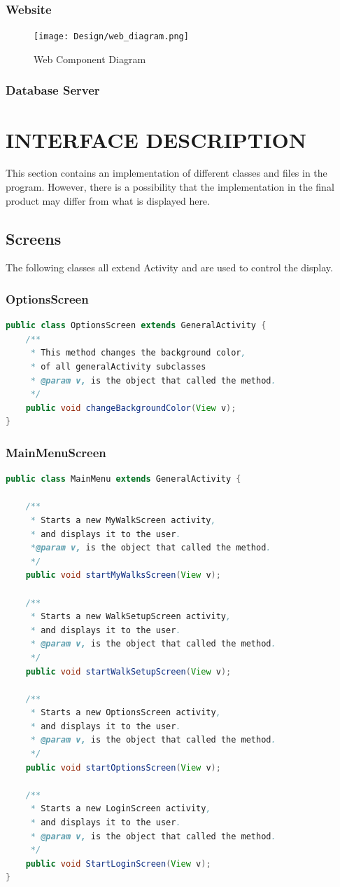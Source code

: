 \documentclass[12pt]{article}
\begin{document}
\subsubsection{Website}
\clearpage
\begin{figure}[htp]

\centering
\texttt{[image: Design/web\_diagram.png]}
\caption{Web Component Diagram}
\label{Web Component Diagram}
\end{figure}
\subsubsection{Database Server}
\section{INTERFACE DESCRIPTION}
This section contains an implementation of different classes and files in the program. However, there is a possibility that the implementation in the final product may differ from what is displayed here.
\subsection{Screens}
The following classes all extend Activity and are used to control the display.
\subsubsection{OptionsScreen}
\begin{lstlisting}[language=java]
public class OptionsScreen extends GeneralActivity {
	/**
	 * This method changes the background color,
	 * of all generalActivity subclasses
	 * @param v, is the object that called the method.
	 */
	public void changeBackgroundColor(View v);
}
\end{lstlisting}
\subsubsection{MainMenuScreen}
\begin{lstlisting}[language=java]
public class MainMenu extends GeneralActivity {

	/**
	 * Starts a new MyWalkScreen activity,
	 * and displays it to the user.
	 *@param v, is the object that called the method.
	 */
	public void startMyWalksScreen(View v);

	/**
	 * Starts a new WalkSetupScreen activity,
	 * and displays it to the user.
	 * @param v, is the object that called the method.
	 */
	public void startWalkSetupScreen(View v);
	
	/**
	 * Starts a new OptionsScreen activity,
	 * and displays it to the user.
	 * @param v, is the object that called the method.
	 */
	public void startOptionsScreen(View v);

	/**
	 * Starts a new LoginScreen activity,
	 * and displays it to the user.
	 * @param v, is the object that called the method.
	 */
	public void StartLoginScreen(View v);
}
\end{lstlisting}
\end{document}
